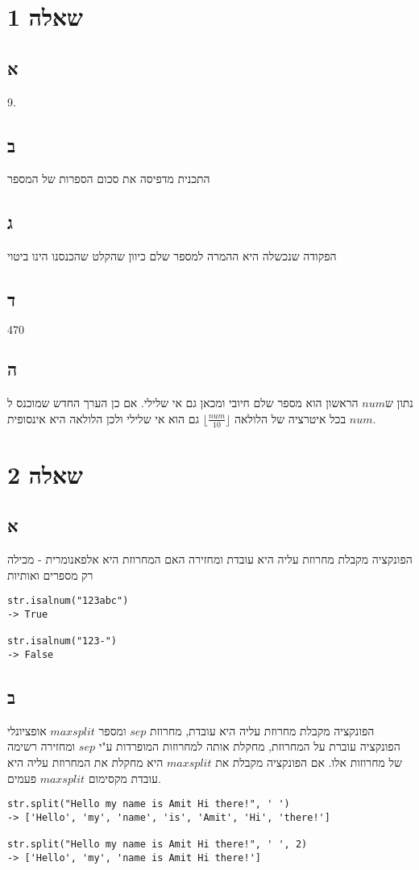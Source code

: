 \documentclass[12pt]{report}
\begin{document}
\section*{שאלה 1}
\subsection*{א}
9.

\subsection*{ב}
התכנית מדפיסה את סכום הספרות של המספר

\subsection*{ג}
הפקודה שנכשלה היא ההמרה למספר שלם כיוון שהקלט שהכנסנו הינו ביטוי

\subsection*{ד}
$470$

\subsection*{ה}
נתון ש$num$ הראשון הוא מספר שלם חיובי ומכאן גם אי שלילי. אם כן הערך החדש שמוכנס ל$num$ בכל איטרציה של הלולאה
$\lfloor \frac{num}{10} \rfloor$
גם הוא אי שלילי ולכן הלולאה היא אינסופית.


\section*{שאלה 2}
\subsection*{א}
הפונקציה מקבלת מחרוזת עליה היא עובדת ומחזירה האם המחרוזת היא אלפאנומרית - מכילה רק מספרים ואותיות
\lstset{language=Python}

\begin{lstlisting}
str.isalnum("123abc")
-> True

str.isalnum("123-")
-> False
\end{lstlisting}

\subsection*{ב}
הפונקציה מקבלת מחרוזת עליה היא עובדת, מחרוזת $sep$ ומספר $maxsplit$ אופציונלי
הפונקציה עוברת על המחרוזת, מחקלת אותה למחרוזות המופרדות ע"י $sep$ ומחזירה רשימה של מחרוזות אלו.
אם הפונקציה מקבלת את $maxsplit$ היא מחקלת את המחרוזת עליה היא עובדת מקסימום $maxsplit$ פעמים.
\begin{lstlisting}
str.split("Hello my name is Amit Hi there!", ' ')  
-> ['Hello', 'my', 'name', 'is', 'Amit', 'Hi', 'there!']

str.split("Hello my name is Amit Hi there!", ' ', 2) 
-> ['Hello', 'my', 'name is Amit Hi there!']
\end{lstlisting}
\end{document}
